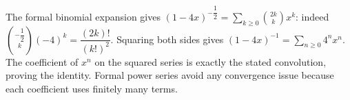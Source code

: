 The formal binomial expansion gives $\displaystyle(1-4x)^{-\dfrac{1}{2}}=\sum_{k\ge0}\binom{2k}{k}x^k$: indeed $\binom{-\dfrac{1}{2}}{k}(-4)^k=\dfrac{(2k)!}{(k!)^2}$. Squaring both sides gives $(1-4x)^{-1}=\sum_{n\ge0}4^n x^n$. The coefficient of $x^n$ on the squared series is exactly the stated convolution, proving the identity. Formal power series avoid any convergence issue because each coefficient uses finitely many terms.
